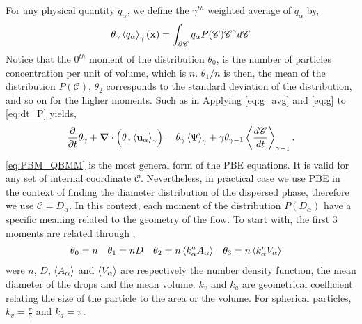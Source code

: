 For any physical quantity $q_\alpha$, we define the $\gamma^{th}$ weighted average of $q_\alpha$ by,
\begin{equation}
    \theta_{\gamma}\gavg{q_\alpha}(\textbf{x})  = \int_{\partial \mathscr{C}} q_\alpha P(\mathscr{C})\mathscr{C}^\gamma d\mathscr{C}
    \label{eq:g_avg}
\end{equation}
Notice that the $0^{th}$ moment of the distribution $\theta_0$, is the number of particles concentration per unit of volume, which is $n$.
$\theta_1/n$ is then, the mean of the distribution $P(\mathscr{C})$, $\theta_2$ corresponds to the standard deviation of the distribution, and so on for the higher moments. 
Such as in 
Applying \ref{eq:g_avg} and \ref{eq:g} to \ref{eq:dt_P} yields,
\begin{equation}
    \label{eq:PBM_QBMM}
    \pddt \theta_{\gamma}  
    + \bm{\nabla} \cdot \left(\theta_\gamma \gavg{\textbf{u}_\alpha}\right)  
    = \theta_{\gamma} \gavg{\Psi} 
    +\gamma \theta_{\gamma-1} \gavg[\gamma-1]{\frac{d \mathscr{C}}{dt}}. 
\end{equation}
\ref{eq:PBM_QBMM} is the most general form of the PBE equations. 
It is valid for any set of internal coordinate $\mathscr{C}$.
Nevertheless, in practical case we use PBE in the context of finding the diameter distribution of the dispersed phase, therefore we use  $\mathscr{C} = D_\alpha$.
In this context, each moment of the distribution $P(D_\alpha)$ have a specific meaning related to the geometry of the flow. 
To start with, the first $3$ moments are related through \citep{morel2010comparison,KAMP20011363,zaepffel2011modelisation},
\begin{align}
    &\theta_0 = n&
    &\theta_1 = n D&
    &\theta_2 =  \pavg{k^a_\alpha A_\alpha}& 
    &\theta_3 =  \pavg{k^v_\alpha V_\alpha}&
    \label{eq:relation}
\end{align}
were $n$, $D$, $\left<A_\alpha\right>$ and $\left<V_\alpha\right>$ are respectively the number density function, the mean diameter of the drops and the mean volume. 
$k_v$ and $k_a$ are geometrical coefficient relating the size of the particle to the area or the volume. 
For spherical particles, $k_v = \frac{\pi}{6}$ and $k_a = \pi$.

